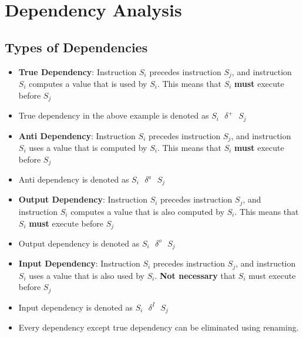 \documentclass{article}
\begin{document}
\section{Dependency Analysis}
\subsection{Types of Dependencies}
\begin{itemize}
    \item \textbf{True Dependency}: Instruction $S_i$ precedes instruction $S_j$, and instruction $S_i$ computes a value that is used by $S_i$. This means that $S_i$ \textbf{must} execute before $S_j$
    
    \item True dependency in the above example is denoted as $S_i\text{ }\delta^+\text{ }S_j$
    
    \item \textbf{Anti Dependency}: Instruction $S_i$ precedes instruction $S_j$, and instruction $S_i$ uses a value that is computed by $S_i$. This means that $S_i$ \textbf{must} execute before $S_j$
    
    \item Anti dependency is denoted as $S_i\text{ }\delta^a\text{ }S_j$
    
    \item \textbf{Output Dependency}: Instruction $S_i$ precedes instruction $S_j$, and instruction $S_i$ computes a value that is also computed by $S_i$. This means that $S_i$ \textbf{must} execute before $S_j$
    
    \item Output dependency is denoted as $S_i\text{ }\delta^o\text{ }S_j$
    
    \item \textbf{Input Dependency}: Instruction $S_i$ precedes instruction $S_j$, and instruction $S_i$ uses a value that is also used by $S_i$. \textbf{Not necessary} that $S_i$ must execute before $S_j$
    
    \item Input dependency is denoted as $S_i\text{ }\delta^I\text{ }S_j$
    
    \item Every dependency except true dependency can be eliminated using renaming. 
\end{itemize}
\end{document}
